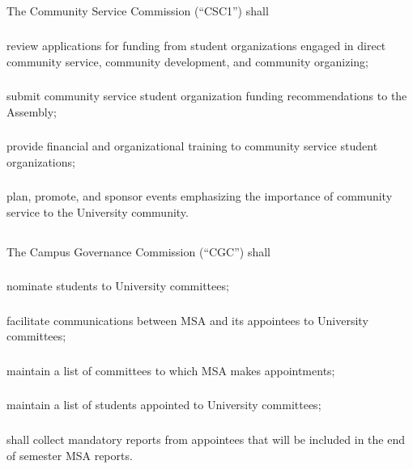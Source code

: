 \subsection{}
The Community Service Commission (``CSC1'') shall 
\subsubsection{}
review applications for funding from student organizations engaged in direct community service, community development, and community organizing;
\subsubsection{}
submit community service student organization funding recommendations to the Assembly;
\subsubsection{}
provide financial and organizational training to community service student organizations;
\subsubsection{}
plan, promote, and sponsor events emphasizing the importance of community service to the University community.

\subsection{}
The Campus Governance Commission (``CGC'') shall
\subsubsection{}
nominate students to University committees;
\subsubsection{}
facilitate communications between MSA and its appointees to University committees;
\subsubsection{}
maintain a list of committees to which MSA makes appointments;
\subsubsection{}
maintain a list of students appointed to University committees;
\subsubsection{}
shall collect mandatory reports from appointees that will be included in the end of semester MSA reports.

